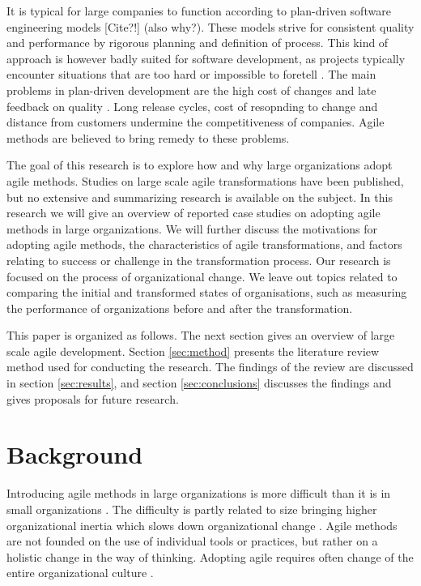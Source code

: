 \documentclass[lnbip]{svmultln}
\begin{document}
It is typical for large companies to function according to plan-driven software
engineering models [Cite?!] (also why?). These models strive for consistent quality and performance
by rigorous planning and definition of process. This kind of approach is however
badly suited for software development, as projects typically encounter
situations that are too hard or impossible to foretell .
The main problems in plan-driven development are the high cost of changes and
late feedback on quality . Long release cycles, cost of
resopnding to change and distance from customers undermine the  competitiveness
of companies. Agile methods are believed to bring remedy to these problems.

The goal of this research is to explore how and why large organizations adopt
agile methods. Studies on large scale agile transformations have been published,
but no extensive and summarizing research is available on the subject. In this
research we will give an overview of reported case studies on adopting agile
methods in large organizations. We will further discuss the motivations for
adopting agile methods, the characteristics of agile transformations, and
factors relating to success or challenge in the transformation process. Our
research is focused on the process of organizational change. We leave out topics
related to comparing the initial and transformed states of organisations, such
as measuring the performance of organizations before and after the
transformation.

This paper is organized as follows. The next section gives an overview of large
scale agile development. Section \ref{sec:method} presents the literature review
method used for conducting the research. The findings of the review are
discussed in section \ref{sec:results}, and section \ref{sec:conclusions}
discusses the findings and gives proposals for future research.


\section{Background}
\label{sec:background}

Introducing agile methods in large organizations is more difficult than it is in
small organizations . The difficulty is partly related to size
bringing higher organizational inertia which slows down organizational change
. Agile methods are not founded on the use of individual
tools or practices, but rather on a holistic change in the way of thinking.
Adopting agile requires often change of the entire organizational culture
.
\end{document}
